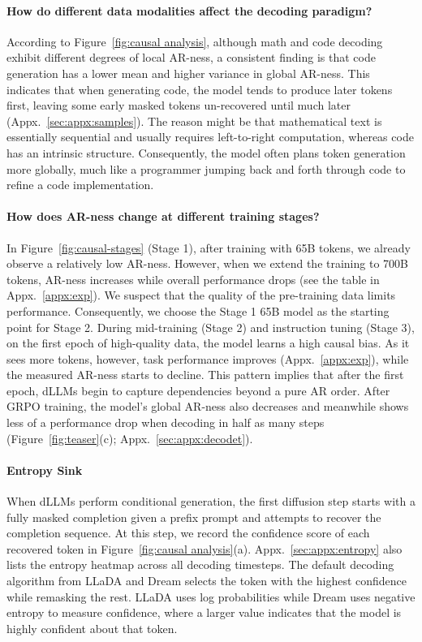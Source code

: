 \paragraph{How do different data modalities affect the decoding paradigm?} 
According to Figure~\ref{fig:causal analysis}, although math and code decoding exhibit different degrees of local AR-ness, a consistent finding is that code generation has a lower mean and higher variance in global AR-ness. 
This indicates that when generating code, the model tends to produce later tokens first, leaving some early masked tokens un-recovered until much later (Appx.~\ref{sec:appx:samples}). 
The reason might be that mathematical text is essentially sequential and usually requires left-to-right computation, whereas code has an intrinsic structure. 
Consequently, the model often plans token generation more globally, much like a programmer jumping back and forth through code to refine a code implementation.
\paragraph{How does AR-ness change at different training stages?}
In Figure~\ref{fig:causal-stages} (Stage 1), after training with 65B tokens, we already observe a relatively low AR-ness. 
However, when we extend the training to 700B tokens, AR-ness increases while overall performance drops (see the table in Appx.~\ref{appx:exp}). 
We suspect that the quality of the pre-training data limits performance. 
Consequently, we choose the Stage 1 65B model as the starting point for Stage 2.
During mid-training (Stage 2) and instruction tuning (Stage 3), on the first epoch of high-quality data, the model learns a high causal bias.
As it sees more tokens, however, task performance improves (Appx.~\ref{appx:exp}), while the measured AR-ness starts to decline. 
This pattern implies that after the first epoch, dLLMs begin to capture dependencies beyond a pure AR order. 
After GRPO training, the model's global AR-ness also decreases and meanwhile shows less of a performance drop when decoding in half as many steps (Figure~\ref{fig:teaser}(c); Appx.~\ref{sec:appx:decodet}).

\paragraph{Entropy Sink} 
When dLLMs perform conditional generation, the first diffusion step starts with a fully masked completion given a prefix prompt and attempts to recover the completion sequence.
At this step, we record the confidence score of each recovered token in Figure~\ref{fig:causal analysis}(a). Appx.~\ref{sec:appx:entropy} also lists the entropy heatmap across all decoding timesteps.
The default decoding algorithm from LLaDA and Dream selects the token with the highest confidence while remasking the rest. 
LLaDA uses log probabilities while Dream uses negative entropy to measure confidence, where a larger value indicates that the model is highly confident about that token. 

